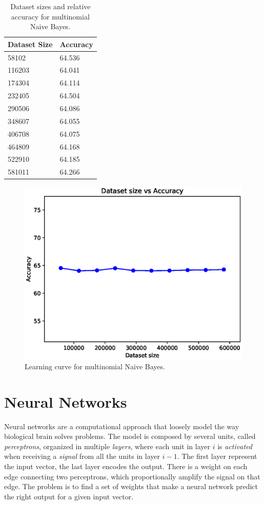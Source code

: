 \documentclass[a4paper, 10pt]{article}
\begin{document}
\begin{table}[H]
\centering
\begin{tabular}{|l|l|}
\hline
\textbf{Dataset Size} & \textbf{Accuracy}\\\hline
58102 & 64.536\\\hline
116203 & 64.041\\\hline
174304 & 64.114\\\hline
232405 & 64.504\\\hline
290506 & 64.086\\\hline
348607 & 64.055\\\hline
406708 & 64.075\\\hline
464809 & 64.168\\\hline
522910 & 64.185\\\hline
581011 & 64.266\\\hline
\end{tabular}
\caption{Dataset sizes and relative accuracy for multinomial Naive Bayes.}
\label{tab:mnb_learning}
\end{table}

\begin{figure}[H]
 \centering
 \includegraphics[width=0.8\linewidth]{pictures/nb_multi_size_vs_accuracy.eps}
 \caption{Learning curve for multinomial Naive Bayes.}
 \label{fig:mnb_learning}
\end{figure}


  
\section{Neural Networks}
Neural networks are a computational approach that loosely model the way biological brain solves problems. The model is composed by several units, called \emph{perceptrons}, organized in multiple \emph{layers}, where each unit in layer $i$ is \emph{activated} when receiving a \emph{signal} from all the units in layer $i-1$. The first layer represent the input vector, the last layer encodes the output. There is a weight on each edge connecting two perceptrons, which proportionally amplify the signal on that edge. The problem is to find a set of weights that make a neural network predict the right output for a given input vector.
\end{document}
